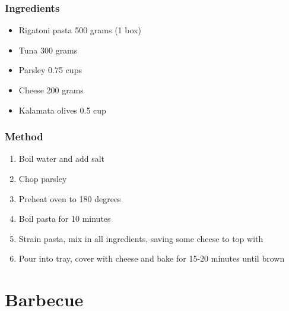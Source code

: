 \documentclass[]{article}
\begin{document}
\subsubsection*{\Large Ingredients}
\begin{multicols}{2}
\begin{itemize}
 \item Rigatoni pasta \hfill 500 grams (1 box)
 \item Tuna \hfill 300 grams
 \item Parsley \hfill 0.75 cups
 \item Cheese \hfill 200 grams
 \item Kalamata olives \hfill 0.5 cup
\end{itemize}
\end{multicols}
\subsubsection*{\Large Method}
\begin{enumerate}[font=\huge\color{accent}]
	\item Boil water and add salt
	\item Chop parsley
	\item Preheat oven to 180 degrees
	\item Boil pasta for 10 minutes
	\item Strain pasta, mix in all ingredients, saving some cheese to top with
	\item Pour into tray, cover with cheese and bake for 15-20 minutes until brown
\end{enumerate}
\newpage
{}
\section*{\center\Huge\color{accent}Barbecue}
\label{cat:Barbecue}
\label{rec:Sausage sizzle}
\end{document}

